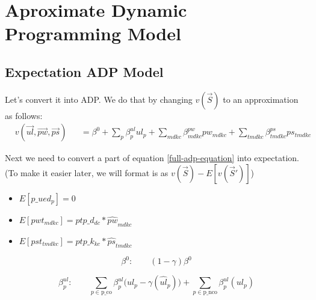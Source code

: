 

\section{Aproximate Dynamic Programming Model}
\subsection{Expectation ADP Model}
Let's convert it into ADP. We do that by changing $v(\vec{S})$ to an approximation as follows:
\begin{equation}\begin{alignedat}{10}
		& v(\vec{ul}, \vec{pw}, \vec{ps}) 
		&& =  \beta^0 + \sum_{p} \beta_{p}^{ul} ul_{p} +
		\sum_{mdkc} \beta_{mdkc}^{pw} pw_{mdkc}  + 
		\sum_{tmdkc} \beta_{tmdkc}^{ps} ps_{tmdkc}
\end{alignedat} \end{equation}

Next we need to convert a part of equation \ref{full-adp-equation} into expectation. \\ 
(To make it easier later, we will format is as $v(\vec{S}) - E[v(\vec{S}')]$)

\begin{itemize}
	\item $E[p\_ued_p] = 0$
	\item $E[pwt_{mdkc}] = ptp\_d_{dc} * \hat{pw}_{mdkc}$ 
	\item $E[pst_{tmdkc}] = ptp\_k_{kc} * \hat{ps}_{tmdkc}$ 
\end{itemize}

\begin{fleqn}[\parindent]
	\begin{equation}
		\beta^{0}: \qquad (1-\gamma) \beta^{0}
	\end{equation}
\end{fleqn}

\begin{fleqn}[\parindent]
	\begin{equation}
		\beta^{ul}_{p}: \qquad 
		\sum_{p \in \text{p\_co}} \beta_{p}^{ul} \Big( ul_{p} - \gamma ( \hat{ul}_{p}) \Big) + 
		\sum_{p \in \text{p\_nco}} \beta_{p}^{ul} ( ul_{p}) 
	\end{equation}
\end{fleqn}

